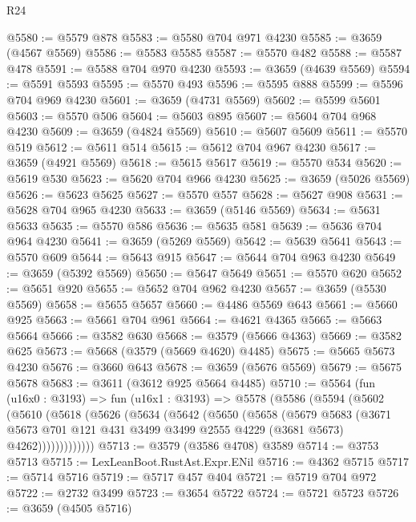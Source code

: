 \begin{lexlean}{R24}
\begin{coremodule}
@5580 := @5579 @878
@5583 := @5580 @704 @971 @4230
@5585 := @3659 (@4567 @5569)
@5586 := @5583 @5585
@5587 := @5570 @482
@5588 := @5587 @478
@5591 := @5588 @704 @970 @4230
@5593 := @3659 (@4639 @5569)
@5594 := @5591 @5593
@5595 := @5570 @493
@5596 := @5595 @888
@5599 := @5596 @704 @969 @4230
@5601 := @3659 (@4731 @5569)
@5602 := @5599 @5601
@5603 := @5570 @506
@5604 := @5603 @895
@5607 := @5604 @704 @968 @4230
@5609 := @3659 (@4824 @5569)
@5610 := @5607 @5609
@5611 := @5570 @519
@5612 := @5611 @514
@5615 := @5612 @704 @967 @4230
@5617 := @3659 (@4921 @5569)
@5618 := @5615 @5617
@5619 := @5570 @534
@5620 := @5619 @530
@5623 := @5620 @704 @966 @4230
@5625 := @3659 (@5026 @5569)
@5626 := @5623 @5625
@5627 := @5570 @557
@5628 := @5627 @908
@5631 := @5628 @704 @965 @4230
@5633 := @3659 (@5146 @5569)
@5634 := @5631 @5633
@5635 := @5570 @586
@5636 := @5635 @581
@5639 := @5636 @704 @964 @4230
@5641 := @3659 (@5269 @5569)
@5642 := @5639 @5641
@5643 := @5570 @609
@5644 := @5643 @915
@5647 := @5644 @704 @963 @4230
@5649 := @3659 (@5392 @5569)
@5650 := @5647 @5649
@5651 := @5570 @620
@5652 := @5651 @920
@5655 := @5652 @704 @962 @4230
@5657 := @3659 (@5530 @5569)
@5658 := @5655 @5657
@5660 := @4486 @5569 @643
@5661 := @5660 @925
@5663 := @5661 @704 @961
@5664 := @4621 @4365
@5665 := @5663 @5664
@5666 := @3582 @630
@5668 := @3579 (@5666 @4363)
@5669 := @3582 @625
@5673 := @5668 (@3579 (@5669 @4620) @4485)
@5675 := @5665 @5673 @4230
@5676 := @3660 @643
@5678 := @3659 (@5676 @5569)
@5679 := @5675 @5678
@5683 := @3611 (@3612 @925 @5664 @4485)
@5710 := @5564
    (fun (u16x0 : @3193) =>
    fun (u16x1 : @3193) =>
    @5578
      (@5586
        (@5594
          (@5602
            (@5610
              (@5618
                (@5626
                  (@5634
                    (@5642
                      (@5650
                        (@5658
                          (@5679
                            @5683
                            (@3671
                              @5673
                              @701
                              @121
                              @431
                              @3499
                              @3499
                              @2555
                              @4229
                              (@3681 @5673)
                              @4262)))))))))))))
@5713 := @3579 (@3586 @4708) @3589
@5714 := @3753 @5713
@5715 := LexLeanBoot.RustAst.Expr.ENil
@5716 := @4362 @5715
@5717 := @5714 @5716
@5719 := @5717 @457 @404
@5721 := @5719 @704 @972
@5722 := @2732 @3499
@5723 := @3654 @5722
@5724 := @5721 @5723
@5726 := @3659 (@4505 @5716)

\end{coremodule}
\end{lexlean}
